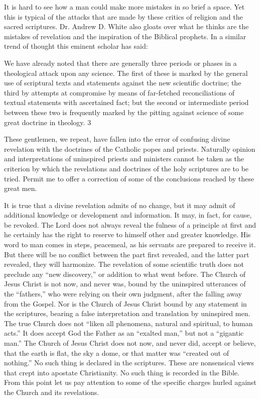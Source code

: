 It is hard to see how a man could make more mistakes in so brief a space. Yet this is typical
of the attacks that are made by these critics of religion and the sacred scriptures. Dr. Andrew
D. White also gloats over what he thinks are the mistakes of revelation and the inspiration of
the Biblical prophets. In a similar trend of thought this eminent scholar has said:

We have already noted that there are generally three periods or phases in a theological attack
upon any science. The first of these is marked by the general use of scriptural texts and
statements against the new scientific doctrine; the third by attempts at compromise by means
of far-fetched reconciliations of textual statements with ascertained fact; but the second or
intermediate period between these two is frequently marked by the pitting against science of
some great doctrine in theology. 3

These gentlemen, we repeat, have fallen into the error of confusing divine revelation with the
doctrines of the Catholic popes and priests. Naturally opinion and interpretations of
uninspired priests and ministers cannot be taken as the criterion by which the revelations and
doctrines of the holy scriptures are to be tried. Permit me to offer a correction of some of the
conclusions reached by these great men.

It is true that a divine revelation admits of no change, but it may admit of additional
knowledge or development and information. It may, in fact, for cause, be revoked. The Lord
does not always reveal the fulness of a principle at first and he certainly has the right to
reserve to himself other and greater knowledge. His word to man comes in steps, peacemeal,
as his servants are prepared to receive it. But there will be no conflict between the part first
revealed, and the latter part revealed, they will harmonize. The revelation of some scientific
truth does not preclude any ``new discovery,'' or addition to what went before. The Church of
Jesus Christ is not now, and never was, bound by the uninspired utterances of the ``fathers,''
who were relying on their own judgment, after the falling away from the Gospel. Nor is the
Church of Jesus Christ bound by any statement in the scriptures, bearing a false interpretation
and translation by uninspired men. The true Church does not ``liken all phenomena, natural
and spiritual, to human acts.'' It does accept God the Father as an ``exalted man,'' but not a
``gigantic man.'' The Church of Jesus Christ does not now, and never did, accept or believe,
that the earth is flat, the sky a dome, or that matter was ``created out of nothing.'' No such
thing is declared in the scriptures. These are nonsensical views that crept into apostate
Christianity. No such thing is recorded in the Bible. From this point let us pay attention to
some of the specific charges hurled against the Church and its revelations.

